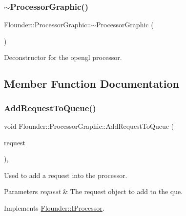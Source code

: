\subsubsection{\texorpdfstring{$\sim$\+Processor\+Graphic()}{~ProcessorGraphic()}}
{\footnotesize\ttfamily Flounder\+::\+Processor\+Graphic\+::$\sim$\+Processor\+Graphic (\begin{DoxyParamCaption}{ }\end{DoxyParamCaption})}



Deconstructor for the opengl processor. 



\subsection{Member Function Documentation}
\mbox{\label{class_flounder_1_1_processor_graphic_a238770973388faedded17e5da1347f2b}} 
\subsubsection{\texorpdfstring{Add\+Request\+To\+Queue()}{AddRequestToQueue()}}
{\footnotesize\ttfamily void Flounder\+::\+Processor\+Graphic\+::\+Add\+Request\+To\+Queue (\begin{DoxyParamCaption}\item[{\hyperlink{class_flounder_1_1_i_request}{I\+Request} $\ast$}]{request }\end{DoxyParamCaption})\hspace{0.3cm}{\ttfamily [override]}, {\ttfamily [virtual]}}



Used to add a request into the processor. 


\begin{DoxyParams}{Parameters}
{\em request} & The request object to add to the que. \\
\hline
\end{DoxyParams}


Implements \hyperlink{class_flounder_1_1_i_processor_a147a68665ac362d33f5de7740279d224}{Flounder\+::\+I\+Processor}.

\mbox{\label{class_flounder_1_1_processor_graphic_a6833c367831f849aede3871e0d6b4956}} 
